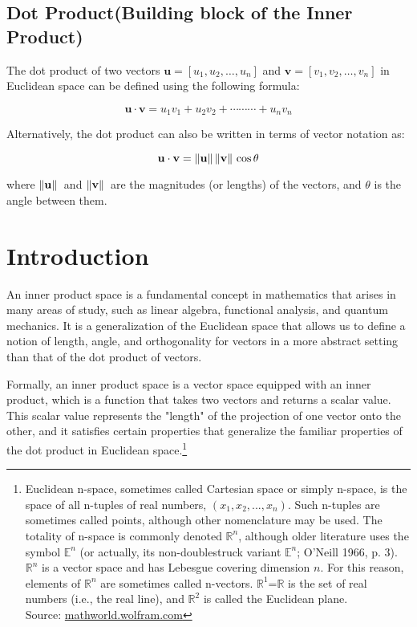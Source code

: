 \documentclass[12pt, a4paper]{article} %
\begin{document}
\subsection{Dot Product(Building block of the Inner Product)}

The dot product of two vectors $\mathbf{u} = [u_1, u_2, \ldots, u_n]$ and $\mathbf{v} = [v_1, v_2, \ldots, v_n]$ in Euclidean space can be defined using the following formula:

\[\mathbf{u} \cdot \mathbf{v} = u_1 v_1 + u_2 v_2 + \cdots \cdots \cdots + u_n v_n\]

Alternatively, the dot product can also be written in terms of vector notation as:

\[\mathbf{u}\cdot \mathbf{v} = \norm*{\mathbf{u}}\norm*{\mathbf{v}}\cos\theta\]

where $\norm*{\mathbf{u}}$ and $\norm*{\mathbf{v}}$ are the magnitudes (or lengths) of the vectors, and $\theta$ is the angle between them.

\newpage

\section{Introduction}

An inner product space is a fundamental concept in mathematics that arises in many areas of study, such as linear algebra, functional analysis, and quantum mechanics. It is a generalization of the Euclidean space that allows us to define a notion of length, angle, and orthogonality for vectors in a more abstract setting than that of the dot product of vectors.

Formally, an inner product space is a vector space equipped with an inner product, which is a function that takes two vectors and returns a scalar value. This scalar value represents the "length" of the projection of one vector onto the other, and it satisfies certain properties that generalize the familiar properties of the dot product in Euclidean space.\footnote{Euclidean n-space, sometimes called Cartesian space or simply n-space, is the space of all n-tuples of real numbers, $(x_1, x_2, ..., x_n)$. Such n-tuples are sometimes called points, although other nomenclature may be used. The totality of n-space is commonly denoted $\mathbb{R}^n$, although older literature uses the symbol $\mathbb{E}^n$ (or actually, its non-doublestruck variant $\mathbb{E}^n$; O'Neill 1966, p. 3).\\


$\mathbb{R}^n$ is a vector space and has Lebesgue covering dimension $n$. For this reason, elements of $\mathbb{R}^n$ are sometimes called n-vectors. $\mathbb{R}^1$=$\mathbb{R}$ is the set of real numbers (i.e., the real line), and $\mathbb{R}^2$ is called the Euclidean plane.\\
\hspace*{10cm} Source: \url{mathworld.wolfram.com}}
\end{document}
